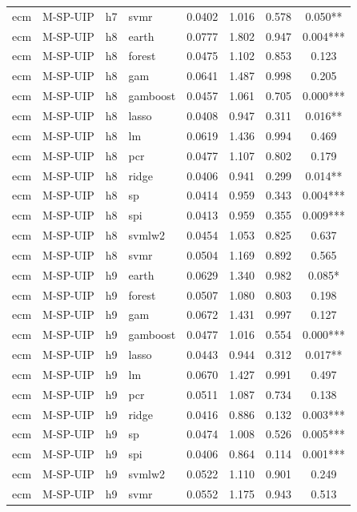 \begin{ThreePartTable}
\begin{longtable}[t]{llclcccc}
ecm & M-SP-UIP & h7 & svmr & 0.0402 & 1.016 & 0.578 & 0.050**\\
\addlinespace
ecm & M-SP-UIP & h8 & earth & 0.0777 & 1.802 & 0.947 & 0.004***\\
ecm & M-SP-UIP & h8 & forest & 0.0475 & 1.102 & 0.853 & 0.123\\
ecm & M-SP-UIP & h8 & gam & 0.0641 & 1.487 & 0.998 & 0.205\\
ecm & M-SP-UIP & h8 & gamboost & 0.0457 & 1.061 & 0.705 & 0.000***\\
ecm & M-SP-UIP & h8 & lasso & 0.0408 & 0.947 & 0.311 & 0.016**\\
ecm & M-SP-UIP & h8 & lm & 0.0619 & 1.436 & 0.994 & 0.469\\
ecm & M-SP-UIP & h8 & pcr & 0.0477 & 1.107 & 0.802 & 0.179\\
ecm & M-SP-UIP & h8 & ridge & 0.0406 & 0.941 & 0.299 & 0.014**\\
ecm & M-SP-UIP & h8 & sp & 0.0414 & 0.959 & 0.343 & 0.004***\\
ecm & M-SP-UIP & h8 & spi & 0.0413 & 0.959 & 0.355 & 0.009***\\
ecm & M-SP-UIP & h8 & svmlw2 & 0.0454 & 1.053 & 0.825 & 0.637\\
ecm & M-SP-UIP & h8 & svmr & 0.0504 & 1.169 & 0.892 & 0.565\\
\addlinespace
ecm & M-SP-UIP & h9 & earth & 0.0629 & 1.340 & 0.982 & 0.085*\\
ecm & M-SP-UIP & h9 & forest & 0.0507 & 1.080 & 0.803 & 0.198\\
ecm & M-SP-UIP & h9 & gam & 0.0672 & 1.431 & 0.997 & 0.127\\
ecm & M-SP-UIP & h9 & gamboost & 0.0477 & 1.016 & 0.554 & 0.000***\\
ecm & M-SP-UIP & h9 & lasso & 0.0443 & 0.944 & 0.312 & 0.017**\\
ecm & M-SP-UIP & h9 & lm & 0.0670 & 1.427 & 0.991 & 0.497\\
ecm & M-SP-UIP & h9 & pcr & 0.0511 & 1.087 & 0.734 & 0.138\\
ecm & M-SP-UIP & h9 & ridge & 0.0416 & 0.886 & 0.132 & 0.003***\\
ecm & M-SP-UIP & h9 & sp & 0.0474 & 1.008 & 0.526 & 0.005***\\
ecm & M-SP-UIP & h9 & spi & 0.0406 & 0.864 & 0.114 & 0.001***\\
ecm & M-SP-UIP & h9 & svmlw2 & 0.0522 & 1.110 & 0.901 & 0.249\\
ecm & M-SP-UIP & h9 & svmr & 0.0552 & 1.175 & 0.943 & 0.513\\

\end{longtable}
\end{ThreePartTable}

